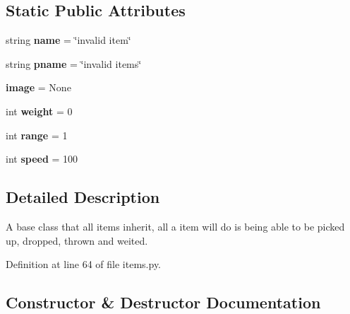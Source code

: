 \subsection*{Static Public Attributes}
\begin{DoxyCompactItemize}
\item 
\hypertarget{classitems_1_1_item_abf64fea9fbcc7043f3184ffc37d65950}{}string {\bfseries name} = \char`\"{}invalid item\char`\"{}\label{classitems_1_1_item_abf64fea9fbcc7043f3184ffc37d65950}

\item 
\hypertarget{classitems_1_1_item_ad2bebd862fd7946cca66fc0f64ea5e09}{}string {\bfseries pname} = \char`\"{}invalid items\char`\"{}\label{classitems_1_1_item_ad2bebd862fd7946cca66fc0f64ea5e09}

\item 
\hypertarget{classitems_1_1_item_ab9fed7c1852d23d4a57c3e12ad8136b2}{}{\bfseries image} = None\label{classitems_1_1_item_ab9fed7c1852d23d4a57c3e12ad8136b2}

\item 
\hypertarget{classitems_1_1_item_a1266b1cd6af34fa84d82403835d23bf2}{}int {\bfseries weight} = 0\label{classitems_1_1_item_a1266b1cd6af34fa84d82403835d23bf2}

\item 
\hypertarget{classitems_1_1_item_a81faa14096a4f3f3c9b0d8fa73be145a}{}int {\bfseries range} = 1\label{classitems_1_1_item_a81faa14096a4f3f3c9b0d8fa73be145a}

\item 
\hypertarget{classitems_1_1_item_a6ad6faef70d37fb376bef114d0f5286b}{}int {\bfseries speed} = 100\label{classitems_1_1_item_a6ad6faef70d37fb376bef114d0f5286b}

\end{DoxyCompactItemize}


\subsection{Detailed Description}
\begin{DoxyVerb}A base class that all items inherit, all a item will do is being able to be picked up, dropped, thrown and weited.
\end{DoxyVerb}
 

Definition at line 64 of file items.\+py.



\subsection{Constructor \& Destructor Documentation}
\hypertarget{classitems_1_1_item_ae3de3fd45b979ded986138a71d80441d}{}
